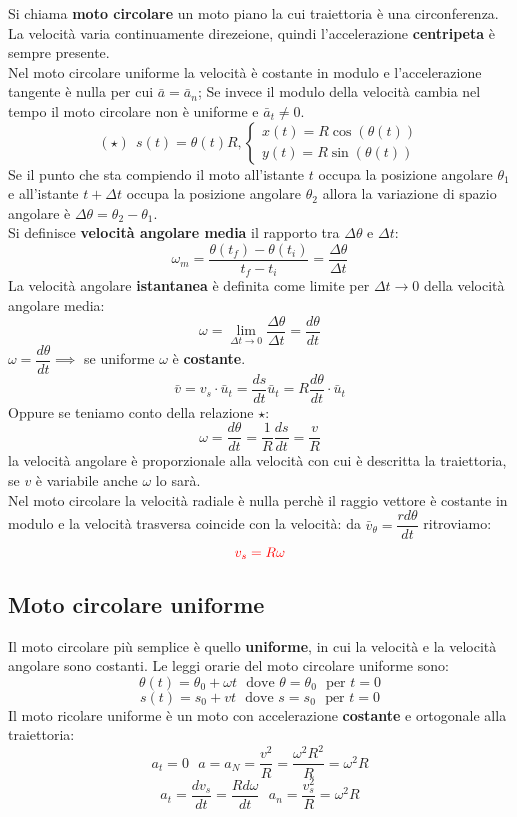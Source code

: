 \documentclass[../../main.tex]{subfiles}
\begin{document}
Si chiama \textbf{moto circolare} un moto piano la cui traiettoria è una circonferenza. La velocità varia continuamente direzeione, quindi l'accelerazione \textbf{centripeta} è sempre presente. \\
Nel moto circolare uniforme la velocità è costante in modulo e l'accelerazione tangente è nulla per cui $\bar a = \bar a_n$; Se invece il modulo della velocità cambia nel tempo il moto circolare non è uniforme e $\bar a_t \neq 0$. \\
\[
    (\star) \ \ s(t) = \theta(t)R , \begin{cases}
        x(t) = R\cos(\theta(t)) \\
        y(t) = R\sin(\theta(t))
    \end{cases}
\]
Se il punto che sta compiendo il moto all'istante $t$ occupa la posizione angolare $\theta_1$ e all'istante $t + \Delta t$ occupa la posizione angolare $\theta_2$ allora la variazione di spazio angolare è $\Delta\theta = \theta_2 - \theta_1$. \\
Si definisce \textbf{velocità angolare media} il rapporto tra $\Delta\theta$ e $\Delta t$:
\[
    \omega_m = \dfrac{\theta(t_f) - \theta(t_i)}{t_f - t_i} = \dfrac{\Delta\theta}{\Delta t}
\]
La velocità angolare \textbf{istantanea} è definita come limite per $\Delta t \to 0$ della velocità angolare media:
\[
    \omega = \lim_{\Delta t \to 0} \dfrac{\Delta\theta}{\Delta t} = \dfrac{d\theta}{dt}
\]
$\omega = \dfrac{d\theta}{dt} \implies $ se uniforme $\omega$ è \textbf{costante}. \\
\[
    \bar v = v_s\cdot\bar u_t = \dfrac{ds}{dt}\bar u_t = R\dfrac{d\theta}{dt}\cdot\bar{u}_t
\]
Oppure se teniamo conto della relazione $\star$:
\[
    \omega = \dfrac{d\theta}{dt} = \dfrac{1}{R}\dfrac{ds}{dt} = \dfrac{v}{R}
\]
la velocità angolare è proporzionale alla velocità con cui è descritta la traiettoria, se $v$ è variabile anche $\omega$ lo sarà.\\
Nel moto circolare la velocità radiale è nulla perchè il raggio vettore è costante in modulo e la velocità trasversa coincide con la velocità: da $\bar v_\theta = \dfrac{rd\theta}{dt}$ ritroviamo:
\[
    \textcolor{red}{v_s = R\omega}
\]
\subsection{Moto circolare uniforme}
Il moto circolare più semplice è quello \textbf{uniforme}, in cui la velocità e la velocità angolare sono costanti. Le leggi orarie del moto circolare uniforme sono:
\[
    \theta(t) = \theta_0 + \omega t \ \ \ \text{dove } \theta = \theta_0  \ \ \ \text{per } t = 0
\]
\[
    s(t) = s_0 + vt \ \ \ \text{dove } s = s_0 \ \ \ \text{per } t = 0
\]
Il moto ricolare uniforme è un moto con accelerazione \textbf{costante} e ortogonale alla traiettoria:
\[
    a_t = 0 \ \ \ a = a_N = \dfrac{v^2}{R} = \dfrac{\omega^2R^2}{R} = \omega^2R
\]
\[
    a_t = \dfrac{dv_s}{dt} = \dfrac{Rd\omega}{dt} \ \ \ a_n = \dfrac{v_s^2}{R} = \omega^2R
\]
\end{document}
